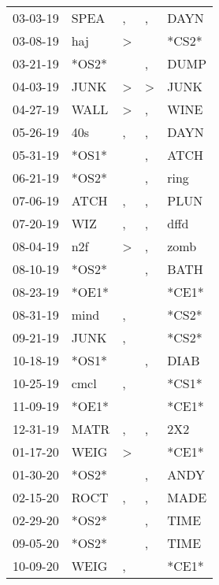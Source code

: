 \begin{supertabular}{lllll}
 03-03-19 &   SPEA &                , &                , &   DAYN \\
 03-08-19 &    haj &     \textgreater &                  &  *CS2* \\
 03-21-19 &  *OS2* &                  &                , &   DUMP \\
 04-03-19 &   JUNK &     \textgreater &     \textgreater &   JUNK \\
 04-27-19 &   WALL &     \textgreater &                , &   WINE \\
 05-26-19 &    40s &                , &                , &   DAYN \\
 05-31-19 &  *OS1* &                  &                , &   ATCH \\
 06-21-19 &  *OS2* &                  &                , &   ring \\
 07-06-19 &   ATCH &                , &                , &   PLUN \\
 07-20-19 &    WIZ &                , &                , &   dffd \\
 08-04-19 &    n2f &     \textgreater &                , &   zomb \\
 08-10-19 &  *OS2* &                  &                , &   BATH \\
 08-23-19 &  *OE1* &                  &                  &  *CE1* \\
 08-31-19 &   mind &                , &                  &  *CS2* \\
 09-21-19 &   JUNK &                , &                  &  *CS2* \\
 10-18-19 &  *OS1* &                  &                , &   DIAB \\
 10-25-19 &   cmcl &                , &                  &  *CS1* \\
 11-09-19 &  *OE1* &                  &                  &  *CE1* \\
 12-31-19 &   MATR &                , &                , &    2X2 \\
 01-17-20 &   WEIG &     \textgreater &                  &  *CE1* \\
 01-30-20 &  *OS2* &                  &                , &   ANDY \\
 02-15-20 &   ROCT &                , &                , &   MADE \\
 02-29-20 &  *OS2* &                  &                , &   TIME \\
 09-05-20 &  *OS2* &                  &                , &   TIME \\
 10-09-20 &   WEIG &                , &                  &  *CE1* \\
\end{supertabular}
